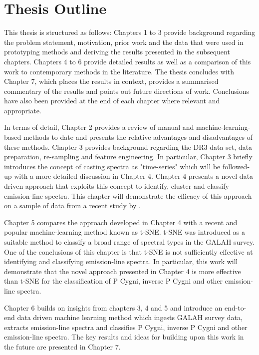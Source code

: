 \section{Thesis Outline}

This thesis is structured as follows: Chapters 1 to 3 provide background regarding the problem statement, motivation, prior work and the data that were used in prototyping methods and deriving the results presented in the subsequent chapters. Chapters 4 to 6 provide detailed results as well as a comparison of this work to contemporary methods in the literature. The thesis concludes with Chapter 7, which places the results in context, provides a summarised commentary of the results and points out future directions of work. Conclusions have also been provided at the end of each chapter where relevant and appropriate. 

In terms of detail, Chapter 2 provides a review of manual and machine-learning-based methods to date and presents the relative advantages and disadvantages of these methods. Chapter 3 provides background regarding the DR3 data set, data preparation, re-sampling and feature engineering. In particular, Chapter 3 briefly introduces the concept of casting spectra as "time-series" which will be followed-up with a more detailed discussion in Chapter 4. Chapter 4 presents a novel data-driven approach that exploits this concept to identify, cluster and classify emission-line spectra. This chapter will demonstrate the efficacy of this approach on a sample of data from a recent study by \citet{vcotar2021galah}. 

Chapter 5 compares the approach developed in Chapter 4 with a recent and popular machine-learning method known as t-SNE. t-SNE was introduced as a suitable method to classify a broad range of spectral types in the GALAH survey. One of the conclusions of this chapter is that t-SNE is not sufficiently effective at identifying and classifying emission-line spectra. In particular, this work will demonstrate that the novel approach presented in Chapter 4 is more effective than t-SNE for the classification of P Cygni, inverse P Cygni and other emission-line spectra.

Chapter 6 builds on insights from chapters 3, 4 and 5 and introduce an end-to-end data driven machine learning method which ingests GALAH survey data, extracts emission-line spectra and classifies P Cygni, inverse P Cygni and other emission-line spectra. The key results and ideas for building upon this work in the future are presented in Chapter 7.

